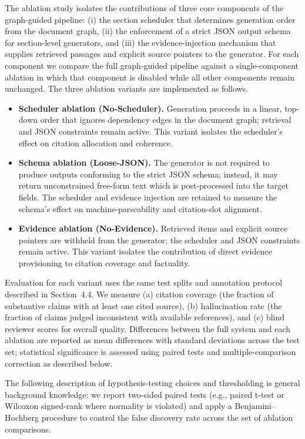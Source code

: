 The ablation study isolates the contributions of three core components of the graph-guided pipeline: (i) the section scheduler that determines generation order from the document graph, (ii) the enforcement of a strict JSON output schema for section-level generators, and (iii) the evidence-injection mechanism that supplies retrieved passages and explicit source pointers to the generator. For each component we compare the full graph-guided pipeline against a single-component ablation in which that component is disabled while all other components remain unchanged. The three ablation variants are implemented as follows.

\begin{itemize}
  \item \textbf{Scheduler ablation (No-Scheduler).} Generation proceeds in a linear, top-down order that ignores dependency edges in the document graph; retrieval and JSON constraints remain active. This variant isolates the scheduler's effect on citation allocation and coherence.
  \item \textbf{Schema ablation (Loose-JSON).} The generator is not required to produce outputs conforming to the strict JSON schema; instead, it may return unconstrained free-form text which is post-processed into the target fields. The scheduler and evidence injection are retained to measure the schema's effect on machine-parseability and citation-slot alignment.
  \item \textbf{Evidence ablation (No-Evidence).} Retrieved items and explicit source pointers are withheld from the generator; the scheduler and JSON constraints remain active. This variant isolates the contribution of direct evidence provisioning to citation coverage and factuality.
\end{itemize}

Evaluation for each variant uses the same test splits and annotation protocol described in Section~4.4. We measure (a) citation coverage (the fraction of substantive claims with at least one cited source), (b) hallucination rate (the fraction of claims judged inconsistent with available references), and (c) blind reviewer scores for overall quality. Differences between the full system and each ablation are reported as mean differences with standard deviations across the test set; statistical significance is assessed using paired tests and multiple-comparison correction as described below.

The following description of hypothesis-testing choices and thresholding is general background knowledge: we report two-sided paired tests (e.g., paired t-test or Wilcoxon signed-rank where normality is violated) and apply a Benjamini--Hochberg procedure to control the false discovery rate across the set of ablation comparisons.

